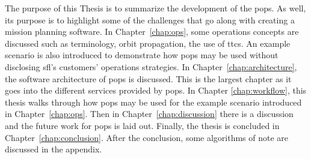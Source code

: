 The purpose of this Thesis is to summarize the development of the
\acrlong{pops}. As well, its purpose is to highlight some of the challenges
that go along with creating a mission planning software. In
Chapter~\ref{chap:ops}, some operations concepts are discussed such as
terminology, orbit propagation, the use of \glspl{ttc}. An example scenario is
also introduced to demonstrate how \gls{pops} may be used without disclosing
\gls{sfl}'s customers' operations strategies. In
Chapter~\ref{chap:architecture}, the software architecture of \gls{pops} is
discussed. This is the largest chapter as it goes into the different services
provided by \gls{pops}. In Chapter \ref{chap:workflow}, this thesis walks through how
\gls{pops} may be used for the example scenario introduced in
Chapter~\ref{chap:ops}. Then in Chapter~\ref{chap:discussion} there is a
discussion and the future work for \gls{pops} is laid out. Finally, the thesis
is concluded in Chapter~\ref{chap:conclusion}.  After the conclusion, some
algorithms of note are discussed in the appendix.




